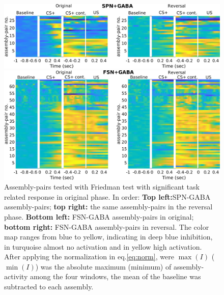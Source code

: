  \begin{figure}
     \centering
     \includegraphics[scale=0.32]{figures/HeatSPN_GABA.pdf}
     
     \vspace{1cm}
     
     \includegraphics[scale=0.32]{figures/HeatFSN_GABA.pdf}
     \caption{Assembly-pairs tested with Friedman test with significant task related response in original phase. In order: \textbf{Top left:}SPN-GABA assembly-pairs; \textbf{top right:} the same assembly-pairs in the reversal phase. \textbf{Bottom left:} FSN-GABA assembly-pairs in original; \textbf{bottom right:} FSN-GABA assembly-pairs in reversal. The color map ranges from blue to yellow, indicating in deep blue inhibition, in turquoise almost no activation and in yellow high activation. After applying the normalization in eq.\ref{eq:norm}, were $\max(I)$ ($\min(I)$) was the absolute maximum (minimum) of assembly-activity among the four windows, the mean of the baseline was subtracted to each assembly.}
     \label{fig:HeatPairsGaba}
 \end{figure}

